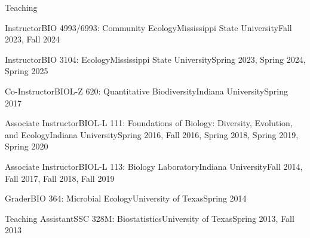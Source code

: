 \documentclass{resume} %
\begin{document}
\begin{rSection}{Teaching}

\begin{Course}
  {Instructor}{BIO 4993/6993: Community Ecology}{Mississippi State University}{Fall 2023, Fall 2024}
\end{Course}

\begin{Course}
  {Instructor}{BIO 3104: Ecology}{Mississippi State University}{Spring 2023, Spring 2024, Spring 2025}
\end{Course}

\begin{Course}
  {Co-Instructor}{BIOL-Z 620: Quantitative Biodiversity}{Indiana University}{Spring 2017}
\end{Course}

\begin{Course}
  {Associate Instructor}{BIOL-L 111: Foundations of Biology: Diversity, Evolution, and Ecology}{Indiana University}{Spring 2016, Fall 2016, Spring 2018, Spring 2019, Spring 2020}
\end{Course}

\begin{Course}
  {Associate Instructor}{BIOL-L 113: Biology Laboratory}{Indiana University}{Fall 2014, Fall 2017, Fall 2018, Fall 2019}
\end{Course}

\begin{Course}
  {Grader}{BIO 364: Microbial Ecology}{University of Texas}{Spring 2014}
\end{Course}

\begin{Course}
  {Teaching Assistant}{SSC 328M: Biostatistics}{University of Texas}{Spring 2013, Fall 2013}
\end{Course}

\end{rSection}

\bigskip
\end{document}
